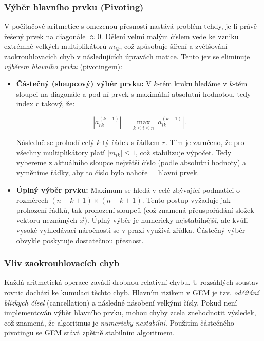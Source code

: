 \subsubsection{Výběr hlavního prvku (Pivoting)}
V počítačové aritmetice s omezenou přesností nastává problém tehdy, je-li právě řešený prvek na diagonále $\approx 0$. Dělení velmi malým číslem vede ke vzniku extrémně velkých multiplikátorů $m_{ik}$, což způsobuje šíření a zvětšování zaokrouhlovacích chyb v následujících úpravách matice. 
Tento jev se eliminuje \textit{výběrem hlavního prvku} (pivotingem):
\begin{itemize}
    \item \textbf{Částečný (sloupcový) výběr prvku:} V $k$-tém kroku hledáme v $k$-tém sloupci na diagonále a pod ní prvek s maximální absolutní hodnotou, tedy index $r$ takový, že:
    
    \[ |a_{rk}^{(k-1)}| = \max_{k \le i \le n} |a_{ik}^{(k-1)}|.\]
    
    Následně se prohodí celý $k$-tý řádek s řádkem $r$. Tím je zaručeno, že pro všechny multiplikátory platí $|m_{ik}| \le 1$, což stabilizuje výpočet.
    Tedy vybereme z aktuálního sloupce největší číslo (podle absolutní hodnoty) a vyměníme řádky, aby to číslo bylo nahoře = hlavní prvek.
    \item \textbf{Úplný výběr prvku:} Maximum se hledá v celé zbývající podmatici o rozměrech $(n-k+1) \times (n-k+1)$. Tento postup vyžaduje jak prohození řádků, tak prohození sloupců (což znamená přeuspořádání složek vektoru neznámých $\vec{x}$). Úplný výběr je numericky nejstabilnější, ale kvůli vysoké vyhledávací náročnosti se v praxi využívá zřídka. Částečný výběr obvykle poskytuje dostatečnou přesnost.
\end{itemize}

\subsubsection{Vliv zaokrouhlovacích chyb}
Každá aritmetická operace zavádí drobnou relativní chybu. U rozsáhlých soustav rovnic dochází ke kumulaci těchto chyb.
Hlavním rizikem v GEM je tzv. \textit{odčítání blízkych čísel} (cancellation) a následné násobení velkými čísly. Pokud není implementován výběr hlavního prvku, mohou chyby zcela znehodnotit výsledek, což znamená, že algoritmus je \textit{numericky nestabilní}. Použitím částečného pivotingu se GEM stává zpětně stabilním algoritmem.

